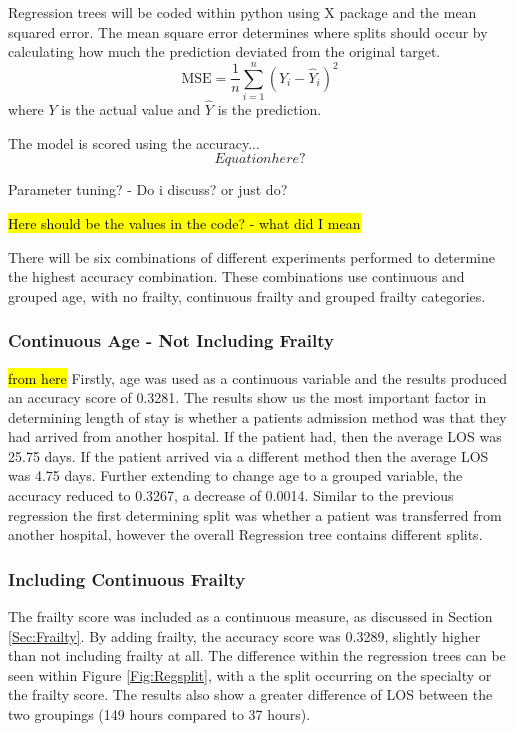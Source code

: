 \documentclass[../thesis.tex]{subfiles}
\begin{document}
Regression trees will be coded within python using X package and the mean squared error. The mean square error determines where splits should occur by calculating how much the prediction deviated from the original target.
\begin{equation}\label{eq:MSE}
    \text{MSE} = \frac{1}{n}\sum^{n}_{i=1}(Y_{i} - \hat{Y}_{i})^2
\end{equation}
where $Y$ is the actual value and $\hat{Y}$ is the prediction.

The model is scored using the accuracy... 
\begin{equation}
    Equation here?
\end{equation}

Parameter tuning? - Do i discuss? or just do?

\hl{Here should be the values in the code? - what did I mean}

There will be six combinations of different experiments performed to determine the highest accuracy combination. These combinations use continuous and grouped age, with no frailty, continuous frailty and grouped frailty categories.
\subsubsection{Continuous Age - Not Including Frailty}\label{Sec:Regression1}
\hl{from here}
Firstly, age was used as a continuous variable and the results produced an accuracy score of 0.3281. The results show us the most important factor in determining length of stay is whether a patients admission method was that they had arrived from another hospital. If the patient had, then the average LOS was 25.75 days. If the patient arrived via a different method then the average LOS was 4.75 days.
Further extending to change age to a grouped variable, the accuracy reduced to 0.3267, a decrease of 0.0014. Similar to the previous regression the first determining split was whether a patient was transferred from another hospital, however the overall Regression tree contains different splits.


\subsubsection{Including Continuous Frailty}\label{Sec:Regression2}
The frailty score was included as a continuous measure, as discussed in Section \ref{Sec:Frailty}. By adding frailty, the accuracy score was 0.3289, slightly higher than not including frailty at all. The difference within the regression trees can be seen within Figure \ref{Fig:Regsplit}, with a the split occurring on the specialty or the frailty score. The results also show a greater difference of LOS between the two groupings (149 hours compared to 37 hours).
\end{document}
